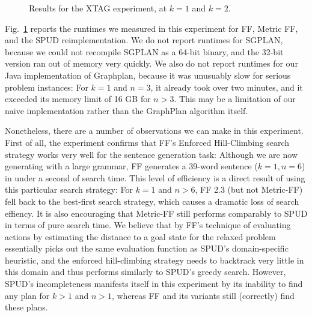 \begin{figure}[t]
  \caption{Results for the XTAG experiment, at $k=1$ and $k=2$.}
  \label{fig:xtag-graph}
\end{figure}

Fig.~\ref{fig:xtag-graph} reports the runtimes we measured in this
experiment for FF, Metric FF, and the SPUD reimplementation. We do not
report runtimes for SGPLAN, because we could not recompile SGPLAN as a
64-bit binary, and the 32-bit version ran out of memory very
quickly. We also do not report runtimes for our Java implementation of
Graphplan, because it was unusuably slow for serious problem
instances: For $k=1$ and $n=3$, it already took over two minutes, and
it exceeded its memory limit of 16 GB for $n>3$. This may be a
limitation of our naive implementation rather than the GraphPlan
algorithm itself.

Nonetheless, there are a number of observations we can make in this
experiment. First of all, the experiment confirms that FF's Enforced
Hill-Climbing search strategy works very well for the sentence
generation task: Although we are now generating with a large grammar,
FF generates a 39-word sentence ($k=1,n=6$) in under a second of
search time. This level of efficiency is a direct result of using this
particular search strategy: For $k=1$ and $n>6$, FF 2.3 (but not
Metric-FF) fell back to the best-first search strategy, which causes a
dramatic loss of search effiency. It is also encouraging that
Metric-FF still performs comparably to SPUD in terms of pure search
time. We believe that by FF's technique of evaluating actions by
estimating the distance to a goal state for the relaxed problem
essentially picks out the same evaluation function as SPUD's domain-specific
heuristic, and the enforced hill-climbing strategy needs to backtrack
very little in this domain and thus performs similarly to SPUD's
greedy search. However, SPUD's incompleteness manifests itself in this
experiment by its inability to find any plan for $k>1$ and $n>1$,
whereas FF and its variants still (correctly) find these plans.

